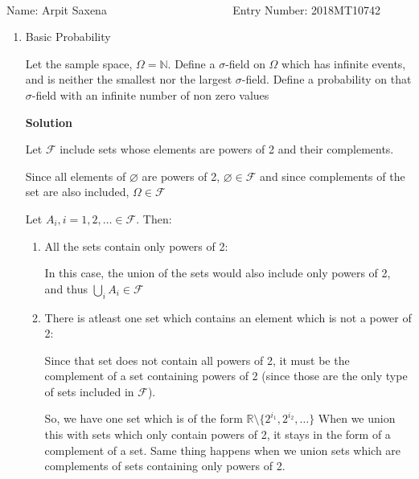 \documentclass[12pt, oneside]{article}
\begin{document}
\setlength{\textheight}{8.5in}
\\





\vskip 0.5cm

\noindent Name: Arpit Saxena ~~~~~~~~~~~~~~~~~~~~~ Entry Number: 2018MT10742



\vskip 0.5cm



\begin{enumerate}
	



\item {
    Basic Probability

    Let the sample space, \(\Omega = \mathbb{N}\). Define a \(\sigma\)-field on \(\Omega\)
    which has infinite events, and is neither the smallest nor the largest \(\sigma\)-field.
    Define a probability on that \(\sigma\)-field with an infinite number of non zero values

    \textbf{Solution}

    Let \(\mathcal{F}\) include sets whose elements are powers of 2 and their complements.
    
    Since all elements of \(\varnothing\) are powers of 2, \(\varnothing \in \mathcal{F}\) 
    and since complements of the set are also included, \(\Omega \in \mathcal{F}\)

    Let \(A_i, i = 1, 2, \ldots \in \mathcal{F}\). Then:
    \begin{enumerate}
        \item {
            All the sets contain only powers of 2:

            In this case, the union of the sets would also include only powers of 2,
            and thus \(\bigcup_{i}A_i \in \mathcal{F}\)
        }
        \item {
            There is atleast one set which contains an element which is not a power of 2:

            Since that set does not contain all powers of 2, it must be the complement
            of a set containing powers of 2 (since those are the only type of sets included
            in \(\mathcal{F}\)). 

            So, we have one set which is of the form \(\mathbb{R} \setminus \{2^{i_1}, 2^{i_2}, \ldots\}\)
            When we union this with sets which only contain powers of 2, it stays in the form
            of a complement of a set. Same thing happens when we union sets which are complements 
            of sets containing only powers of 2.

}
\end{enumerate}}
\end{enumerate}
\end{document}
